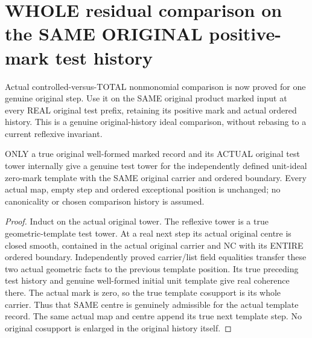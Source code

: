 \section{WHOLE residual comparison on the SAME ORIGINAL positive-mark test history}

Actual controlled-versus-TOTAL nonmonomial comparison is now proved for
one genuine original step. Use it on the SAME original product marked
input at every REAL original test prefix, retaining its positive mark
and actual ordered history. This is a genuine original-history ideal
comparison, without rebasing to a current reflexive invariant.

\begin{lemma}
\label{hir:sharp-actual-original-test-history-genuine-template}
\leanok
ONLY a true original well-formed marked record and its ACTUAL original
test tower internally give a genuine test tower for the independently
defined unit-ideal zero-mark template with the SAME original carrier and
ordered boundary. Every actual map, empty step and ordered exceptional
position is unchanged; no canonicality or chosen comparison history is
assumed.
\end{lemma}
\begin{proof}
Induct on the actual original tower. The reflexive tower is a true
geometric-template test tower. At a real next step its actual original
centre is closed smooth, contained in the actual original carrier and
NC with its ENTIRE ordered boundary. Independently proved carrier/list
field equalities transfer these two actual geometric facts to the
previous template position. Its true preceding test history and genuine
well-formed initial unit template give real coherence there. The actual
mark is zero, so the true template cosupport is its whole carrier. Thus
that SAME centre is genuinely admissible for the actual template record.
The same actual map and centre append its true next template step.
No original cosupport is enlarged in the original history itself.
\end{proof}

